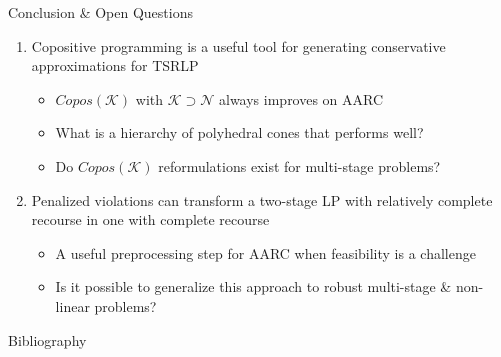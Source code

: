 \documentclass[xcolor=x11names,compress]{beamer}
\renewcommand{\(}{\begin{columns}}
\renewcommand{\)}{\end{columns}}
\newcommand{\<}[1]{\begin{column}{#1}}
\renewcommand{\>}{\end{column}}
\newcommand{\0}{\V{0}}
\newcommand{\1}{\V{1}}
\newcommand{\mymbox}[1]{\mbox{\scriptsize #1}}
\newcommand{\N}{\mathcal{N}}
\newcommand{\copconeCopos}{\mathcal{K}_{\mymbox{Cop}}}
\begin{document}
\begin{frame}{Conclusion \& Open Questions}
\begin{enumerate}
\item Copositive programming is a useful tool for generating conservative approximations for TSRLP
\begin{itemize}
\item $Copos(\mathcal{K})$ with $\mathcal{K} \supset \N$ always improves on AARC

\pause\vspace{0.3cm}
\item {\color{blue} What is a hierarchy of polyhedral cones that performs well?}
\item  {\color{blue} Do $Copos(\mathcal{K})$ reformulations exist for multi-stage problems?}
\end{itemize}
\pause\vspace{0.25cm}\item Penalized violations can transform a two-stage LP with relatively complete recourse in one with complete recourse
\vspace{-0.35cm}\begin{itemize}
\item A useful preprocessing step for AARC when feasibility is a challenge
\pause\vspace{0.3cm}\item {\color{blue}Is it possible to generalize this approach to robust multi-stage \& non-linear problems?}
\end{itemize}
\end{enumerate}
\end{frame}

\begin{frame}{Bibliography}
\tiny
\nocite{delage15:rosplfaip,BenTal_Nemirov_1999,ben2004adjustable,ardestani2017LRC,ardestani2018:VFRLTP}
\nocite{BomzeKlerk:Copos,Burer:Copos,HanasusantoCoposWass,ParriloThesis,XuTSROCopos,zeng2013solving}





\end{frame}
\end{document}
